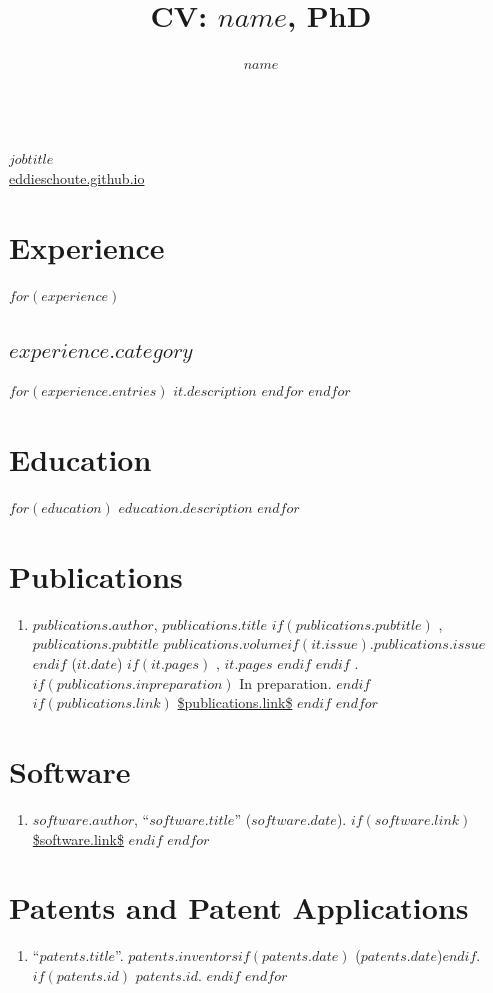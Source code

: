 \documentclass[11pt]{article}
\title{CV: $name$, PhD}
\author{$name$}
\date{}
\makeatletter
\renewcommand\maketitle{
		{%
			\noindent {\Large\sffamily\bfseries \@author, PhD}\\
			{\large\normalfont\itshape $jobtitle$}\\
			{\normalsize\sffamily\upshape \href{https://eddieschoute.github.io}{eddieschoute.github.io}}
		}
	}
\makeatother
\begin{document}
%
\thispagestyle{empty}

\maketitle

\section{Experience}
$for(experience)$
\subsection{$experience.category$}
$for(experience.entries)$
$it.description$
$endfor$
$endfor$

\section{Education}
$for(education)$
$education.description$
$endfor$

\vspace{14pt}
\section{Publications}
\begin{enumerate}
$for(publications)$
\item $publications.author$, $publications.title$%
$if(publications.pubtitle)$
, \emph{$publications.pubtitle$}
$publications.volume$$if(it.issue)$.$publications.issue$$endif$ ($it.date$)%
$if(it.pages)$
, $it.pages$%
$endif$
$endif$
.
$if(publications.inpreparation)$
In preparation.
$endif$
$if(publications.link)$
\url{$publications.link$}
$endif$
$endfor$
\end{enumerate}

\section{Software}
\begin{enumerate}
$for(software)$
\item $software.author$, ``$software.title$'' ($software.date$).
$if(software.link)$
\url{$software.link$}
$endif$
$endfor$
\end{enumerate}

\section{Patents and Patent Applications}
\begin{enumerate}
$for(patents)$
\item ``$patents.title$''. $patents.inventors$$if(patents.date)$ ($patents.date$)$endif$.
$if(patents.id)$
$patents.id$.
$endif$
$endfor$
\end{enumerate}
\end{document}
